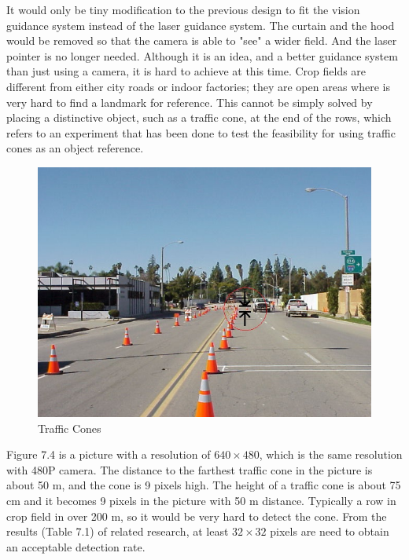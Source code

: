 \documentclass[letterpaper,12pt,oneside]{book}
\begin{document}
		It would only be tiny modification to the previous design to fit the vision guidance system instead of the laser guidance system. The curtain and the hood would be removed so that the camera is able to "see" a wider field. And the laser pointer is no longer needed. Although it is an idea, and a better guidance system than just using a camera, it is hard to achieve at this time. Crop fields are different from either city roads or indoor factories; they are open areas where is very hard to find a landmark for reference. This cannot be simply solved by placing a distinctive object, such as a traffic cone, at the end of the rows, which refers to an experiment that has been done to test the feasibility for using traffic cones as an object reference. 
		\begin{figure}[ht!]
			\begin{center}
				\includegraphics[scale = 0.8]{cone.jpg}
				\caption{Traffic Cones}
			\end{center}
		\end{figure}
		Figure 7.4 is a picture with a resolution of $640\times480$, which is the same resolution with 480P camera. The distance to the farthest traffic cone in the picture is about 50 m, and the cone is 9 pixels high. The height of a traffic cone is about 75 cm and it becomes 9 pixels in the picture with 50 m distance. Typically a row in crop field in over 200 m, so it would be very hard to detect the cone. From the results (Table 7.1) of related research, at least $32\times32$ pixels are need to obtain an acceptable detection rate. \cite{torralba2009many}
\end{document}
